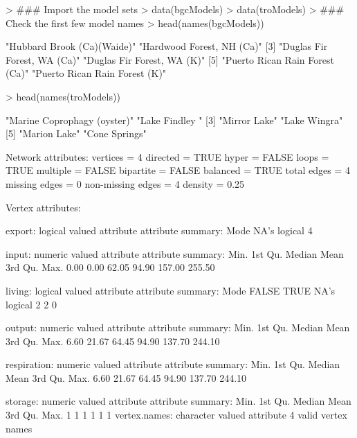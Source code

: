 \documentclass[article]{jss}
\begin{document}
\begin{Schunk}
\begin{Sinput}
> ### Import the model sets
> data(bgcModels)
> data(troModels)
> ### Check the first few model names
> head(names(bgcModels))
\end{Sinput}
\begin{Soutput}
[1] "Hubbard Brook (Ca)(Waide)"     "Hardwood Forest, NH (Ca)"     
[3] "Duglas Fir Forest, WA (Ca)"    "Duglas Fir Forest, WA (K)"    
[5] "Puerto Rican Rain Forest (Ca)" "Puerto Rican Rain Forest (K)" 
\end{Soutput}
\begin{Sinput}
> head(names(troModels))
\end{Sinput}
\begin{Soutput}
[1] "Marine Coprophagy (oyster)" "Lake Findley "             
[3] "Mirror Lake"                "Lake Wingra"               
[5] "Marion Lake"                "Cone Springs"              
\end{Soutput}
\begin{Soutput}
Network attributes:
  vertices = 4
  directed = TRUE
  hyper = FALSE
  loops = TRUE
  multiple = FALSE
  bipartite = FALSE
  balanced = TRUE
 total edges = 4 
   missing edges = 0 
   non-missing edges = 4 
 density = 0.25 

Vertex attributes:

 export:
   logical valued attribute
   attribute summary:
   Mode    NA's 
logical       4 

 input:
   numeric valued attribute
   attribute summary:
   Min. 1st Qu.  Median    Mean 3rd Qu.    Max. 
   0.00    0.00   62.05   94.90  157.00  255.50 

 living:
   logical valued attribute
   attribute summary:
   Mode   FALSE    TRUE    NA's 
logical       2       2       0 

 output:
   numeric valued attribute
   attribute summary:
   Min. 1st Qu.  Median    Mean 3rd Qu.    Max. 
   6.60   21.67   64.45   94.90  137.70  244.10 

 respiration:
   numeric valued attribute
   attribute summary:
   Min. 1st Qu.  Median    Mean 3rd Qu.    Max. 
   6.60   21.67   64.45   94.90  137.70  244.10 

 storage:
   numeric valued attribute
   attribute summary:
   Min. 1st Qu.  Median    Mean 3rd Qu.    Max. 
      1       1       1       1       1       1 
  vertex.names:
   character valued attribute
   4 valid vertex names


\end{Soutput}
\end{Schunk}
\end{document}
